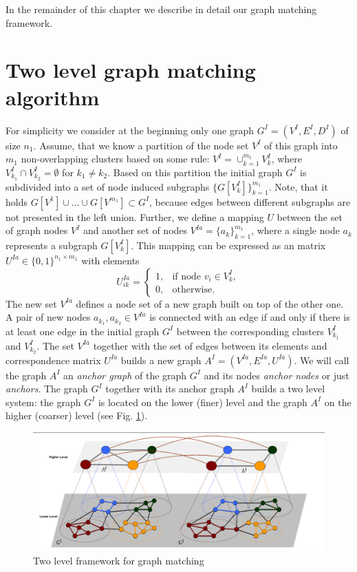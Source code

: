 In the remainder of this chapter we describe in detail our graph matching framework.

\section{Two level graph matching algorithm}
For simplicity we consider at the beginning only one graph $G^I=(V^I,E^I,D^I)$ of size $n_1$. Assume, that we know a partition of the node set $V^I$ of this graph into $m_1$ non-overlapping clusters based on some rule: $V^I=\cup_{k=1}^{m_1}V^I_k$, where $V^I_{k_1}\cap V^I_{k_2}=\emptyset$ for $k_1\not=k_2$. Based on this partition the initial graph $G^I$ is subdivided into a set of node induced subgraphs $\{G[V^I_k]\}_{k=1}^{m_1}$. Note, that it holds $G[V^1]\cup\dots\cup G[V^{m_1}]\subset G^I$, because edges between different subgraphs are not presented in the left union.
Further, we define a mapping $U$ between the set of graph nodes $V^I$ and another set of nodes $V^{Ia}=\{a_k\}_{k=1}^{m_1}$, where a single node $a_k$ represents a subgraph  $G[V^I_k]$. This mapping can be expressed as an matrix $U^{Ia}\in\{0,1\}^{n_1\times m_1}$ with elements 
\begin{equation}\label{eq:matrixU}
U^{Ia}_{ik} = \begin{cases} 1, & \mbox{if node } v_i\in V^I_k,    \\
0, & \mbox{otherwise}.\end{cases}
\end{equation}
The new set $V^{Ia}$ defines a node set of a new graph built on top of the other one. A pair of new nodes $a_{k_1},a_{k_2}\in V^{Ia}$ is connected with an edge if and only if there is at least one edge in the initial graph $G^I$ between the corresponding clusters $V^I_{k_1}$ and $V^I_{k_2}$. The set $V^{Ia}$ together with the set of edges between its elements and correspondence matrix $U^{Ia}$ builds a new graph $A^I=(V^{Ia},E^{Ia},U^{Ia})$. We will call the graph $A^I$ an \emph{anchor graph} of the graph $G^I$ and its nodes \emph{anchor nodes} or just \emph{anchors}. The graph $G^I$ together with its anchor graph $A^I$ builds a two level system: the graph $G^I$ is located on the lower (finer) level and the graph $A^I$ on the higher (coarser) level (see Fig. \ref{fig:2levels}).

\begin{figure} [h!]
	\centering
	\includegraphics[scale=0.45]{chapter2/fig/twolevels3.png}
	\caption{Two level framework for graph matching} \label{fig:2levels}
\end{figure}

